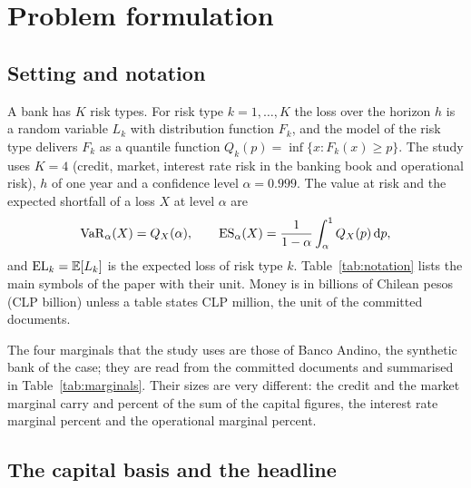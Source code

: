 \section{Problem formulation}
\label{sec:problem}

\subsection{Setting and notation}
\label{sec:problem-setting}

A bank has $K$ risk types. For risk type $k=1,\dots,K$ the loss over the horizon $h$ is a random variable $L_k$ with distribution
function $F_k$, and the model of the risk type delivers $F_k$ as a quantile function $Q_k(p)=\inf\{x:F_k(x)\ge p\}$. The study
uses $K=4$ (credit, market, interest rate risk in the banking book and operational risk), $h$ of one year and a confidence level
$\alpha=0.999$. The value at risk and the expected shortfall of a loss $X$ at level $\alpha$ are
\begin{equation}
\operatorname{VaR}_\alpha(X)=Q_X(\alpha),\qquad
\operatorname{ES}_\alpha(X)=\frac{1}{1-\alpha}\int_\alpha^1 Q_X(p)\,\mathrm{d} p ,
\label{eq:var-es}
\end{equation}
and $\mathrm{EL}_k=\mathbb{E}[L_k]$ is the expected loss of risk type $k$. Table~\ref{tab:notation} lists the main symbols of the paper with their
unit. Money is in billions of Chilean pesos (CLP billion) unless a table states CLP million, the unit of the committed documents.



The four marginals that the study uses are those of Banco Andino, the synthetic bank of the case; they are read from the committed
documents and summarised in Table~\ref{tab:marginals}. Their sizes are very different: the credit and the market marginal carry \bdEcShareCredit{} and \bdEcShareMarket{} percent of the sum of the capital figures, the interest rate marginal \bdEcShareIrrbb{} percent and the operational marginal \bdEcShareOperational{} percent.



\subsection{The capital basis and the headline}
\label{sec:problem-basis}

